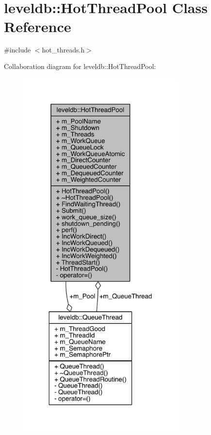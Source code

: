 \hypertarget{classleveldb_1_1_hot_thread_pool}{}\section{leveldb\+:\+:Hot\+Thread\+Pool Class Reference}
\label{classleveldb_1_1_hot_thread_pool}


{\ttfamily \#include $<$hot\+\_\+threads.\+h$>$}



Collaboration diagram for leveldb\+:\+:Hot\+Thread\+Pool\+:\nopagebreak
\begin{figure}[H]
\begin{center}
\leavevmode
\includegraphics[width=239pt]{classleveldb_1_1_hot_thread_pool__coll__graph}
\end{center}
\end{figure}
